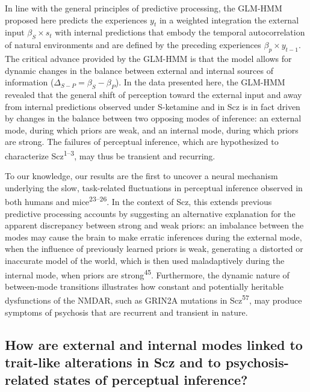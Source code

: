 \documentclass[
]{article}
\begin{document}
In line with the general principles of predictive processing, the
GLM-HMM proposed here predicts the experiences \(y_t\) in a weighted
integration the external input \(\beta_S \times s_t\) with internal
predictions that embody the temporal autocorrelation of natural
environments and are defined by the preceding experiences
\(\beta_p \times y_{t-1}\). The critical advance provided by the GLM-HMM
is that the model allows for dynamic changes in the balance between
external and internal sources of information
(\(\Delta_{S-P} = \beta_S - \beta_P\)). In the data presented here, the
GLM-HMM revealed that the general shift of perception toward the
external input and away from internal predictions observed under
S-ketamine and in Scz is in fact driven by changes in the balance
between two opposing modes of inference: an external mode, during which
priors are weak, and an internal mode, during which priors are strong.
The failures of perceptual inference, which are hypothesized to
characterize Scz\textsuperscript{1--3}, may thus be transient and
recurring.

To our knowledge, our results are the first to uncover a neural
mechanism underlying the slow, task-related fluctuations in perceptual
inference observed in both humans and mice\textsuperscript{23--26}. In
the context of Scz, this extends previous predictive processing accounts
by suggesting an alternative explanation for the apparent discrepancy
between strong and weak priors: an imbalance between the modes may cause
the brain to make erratic inferences during the external mode, when the
influence of previously learned priors is weak, generating a distorted
or inaccurate model of the world, which is then used maladaptively
during the internal mode, when priors are strong\textsuperscript{45}.
Furthermore, the dynamic nature of between-mode transitions illustrates
how constant and potentially heritable dysfunctions of the NMDAR, such
as GRIN2A mutations in Scz\textsuperscript{57}, may produce symptoms of
psychosis that are recurrent and transient in nature.

\subsection{How are external and internal modes linked to trait-like
alterations in Scz and to psychosis-related states of perceptual
inference?}\label{how-are-external-and-internal-modes-linked-to-trait-like-alterations-in-scz-and-to-psychosis-related-states-of-perceptual-inference}
\end{document}
